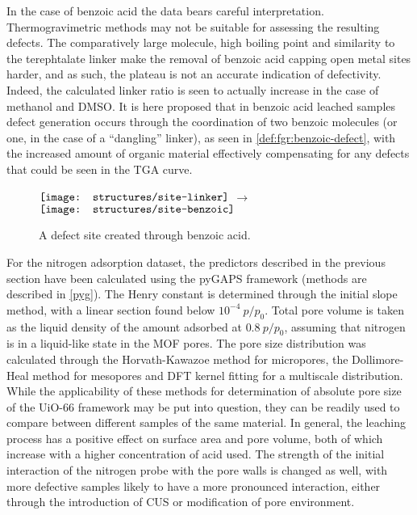 In the case of benzoic acid the data bears careful interpretation. 
Thermogravimetric methods may not be suitable 
for assessing the resulting defects. The comparatively large molecule,
high boiling point and similarity to the terephtalate linker
make the removal of benzoic acid capping open metal sites harder, and
as such, the plateau is not an accurate indication of defectivity.
Indeed, the calculated linker ratio is seen to actually increase in 
the case of methanol and DMSO. It is here proposed that in benzoic acid 
leached samples defect generation occurs through the coordination
of two benzoic molecules (or one, in the case of a ``dangling'' linker), 
as seen in \autoref{def:fgr:benzoic-defect},
with the increased amount of organic material effectively compensating
for any defects that could be seen in the TGA curve.

\begin{figure}[htb]
    \centering
    \( \vcenter{\hbox{\texttt{[image: structures/site-linker]}}}\)%
    \( \longrightarrow \)%
    \(\vcenter{\hbox{\texttt{[image: structures/site-benzoic]}}}\)
    \caption{A defect site created through benzoic acid.}%
    \label{def:fgr:benzoic-defect}
\end{figure}

For the nitrogen adsorption dataset, the predictors described in the 
previous section have been calculated using the pyGAPS framework
(methods are described in \autoref{pyg}). The Henry constant is determined 
through the initial slope method, with a linear section found below 
\(10^{-4}~p/p_0\). Total pore volume is taken as the liquid density
of the amount adsorbed at \(0.8~p/p_0\), assuming that 
nitrogen is in a liquid-like state in the MOF pores. The pore
size distribution was calculated through the Horvath-Kawazoe
method for micropores, the Dollimore-Heal method for mesopores
and DFT kernel fitting for a multiscale distribution. While 
the applicability of these methods for determination of absolute
pore size of the UiO-66 framework may be put into question, 
they can be readily used to compare between different samples
of the same material.
In general, the leaching process has a positive effect on 
surface area and pore volume, both of which increase 
with a higher concentration of acid used. The strength of 
the initial interaction of the nitrogen probe with the pore 
walls is changed as well, with more defective samples likely
to have a more pronounced interaction, either through the introduction
of CUS or modification of pore environment.

